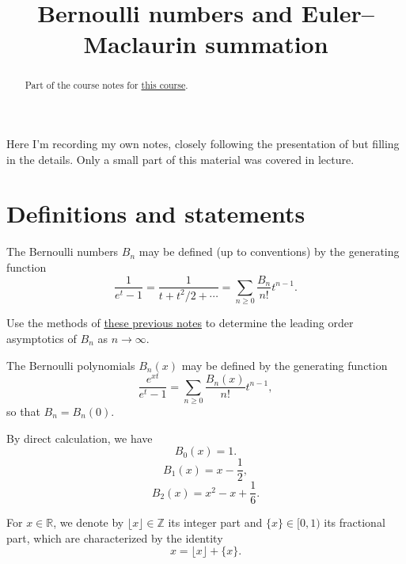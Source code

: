 \documentclass[reqno]{amsart} 
\begin{document}
\title{Bernoulli numbers and Euler--Maclaurin summation}
\begin{abstract}
  Part of the course notes for \href{2023-introduction-to-zeta-and-l-functions.pdf}{this course}.
\end{abstract}



Here I'm recording my own notes, closely following the presentation of \cite[\S4]{zagier-mellin} but filling in the details.  Only a small part of this material was covered in lecture.


\section{Definitions and statements}

The Bernoulli numbers $B_n$ may be defined (up to conventions) by the generating function
\begin{equation*}
  \frac{1}{e^t - 1}
  =
  \frac{1}{t + t^2/2 + \dotsb }
  = \sum_{n \geq 0} \frac{B_n }{ n !} t^{n - 1}.
\end{equation*}
\begin{exercise}
Use the methods of \href{20230907T142550--generating-functions-asymptotics.pdf}{these previous notes} to determine the leading order asymptotics of $B_n$ as $n \rightarrow \infty$.
\end{exercise}
The Bernoulli polynomials $B_n(x)$ may be defined by the generating function
\begin{equation}\label{eq:cj4sr7qmvd}
\frac{e^{x t} }{ e^t - 1 } = \sum_{n \geq 0} \frac{B_n (x) }{n !} t^{n-1},
\end{equation}
so that $B_n = B_n(0)$.


\begin{example}
  By direct calculation, we have
  \begin{equation}\label{eq:cj4sr7wpkw}
    B_0(x) = 1.
  \end{equation}
  \begin{equation*}
    B_1(x) = x - \frac{1}{2},
  \end{equation*}
  \begin{equation*}
    B_2(x) = x^2 - x + \frac{1}{6}.
  \end{equation*}
\end{example}

\begin{notation}
  For $x \in \mathbb{R}$, we denote by $\lfloor x \rfloor \in \mathbb{Z}$ its integer part and $\{x\} \in [0,1)$ its fractional part, which are characterized by the identity
  \begin{equation*}
x = \lfloor x \rfloor + \{x\}.
\end{equation*}
\end{notation}
\end{document}
